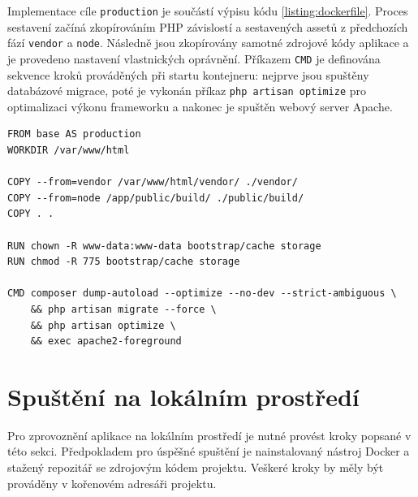 Implementace cíle \texttt{production} je součástí výpisu kódu \ref{listing:dockerfile}. Proces sestavení začíná zkopírováním PHP závislostí a sestavených assetů z předchozích fází \texttt{vendor} a \texttt{node}. Následně jsou zkopírovány samotné zdrojové kódy aplikace a je provedeno nastavení vlastnických oprávnění. Příkazem \texttt{CMD} je definována sekvence kroků prováděných při startu kontejneru: nejprve jsou spuštěny databázové migrace, poté je vykonán příkaz \texttt{php artisan optimize} pro optimalizaci výkonu frameworku a nakonec je spuštěn webový server Apache.

\begin{listing}[h!]
    \caption{Cíl production z Dockerfile souboru}\label{listing:dockerfile}
    \begin{verbatim}
FROM base AS production
WORKDIR /var/www/html

COPY --from=vendor /var/www/html/vendor/ ./vendor/
COPY --from=node /app/public/build/ ./public/build/
COPY . .

RUN chown -R www-data:www-data bootstrap/cache storage
RUN chmod -R 775 bootstrap/cache storage

CMD composer dump-autoload --optimize --no-dev --strict-ambiguous \
    && php artisan migrate --force \
    && php artisan optimize \
    && exec apache2-foreground
    \end{verbatim}
\end{listing}

\newpage
\section{Spuštění na lokálním prostředí}
Pro zprovoznění aplikace na lokálním prostředí je nutné provést kroky popsané v této sekci. Předpokladem pro úspěšné spuštění je nainstalovaný nástroj Docker a stažený repozitář se zdrojovým kódem projektu. Veškeré kroky by měly být prováděny v kořenovém adresáři projektu.

